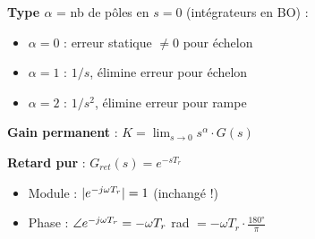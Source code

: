 \begin{tcolorbox}[colback=ch2orange!5,colframe=ch2orange!80!black,title={Type $\alpha$, Retard pur, Gain permanent}]
\textbf{Type $\alpha$} = nb de p\^oles en $s{=}0$ (int\'egrateurs en BO) :
\begin{itemize}
  \item $\alpha{=}0$ : erreur statique $\neq 0$ pour \'echelon
  \item $\alpha{=}1$ : $1/s$, \'elimine erreur pour \'echelon
  \item $\alpha{=}2$ : $1/s^2$, \'elimine erreur pour rampe
\end{itemize}
\textbf{Gain permanent} : $\boxed{K = \lim_{s\to 0} s^\alpha \cdot G(s)}$

\textbf{Retard pur} : $G_{ret}(s) = e^{-sT_r}$
\begin{itemize}
  \item Module : $|e^{-j\omega T_r}| = 1$ (inchang\'e !)
  \item Phase : $\angle e^{-j\omega T_r} = -\omega T_r$ rad $= -\omega T_r \cdot \frac{180°}{\pi}$
\end{itemize}
\end{tcolorbox}

